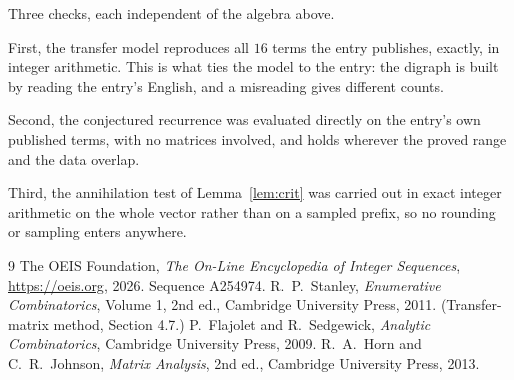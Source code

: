 \documentclass[11pt,a4paper]{article}
\theoremstyle{plain}
\theoremstyle{definition}
\begin{document}
Three checks, each independent of the algebra above.

First, the transfer model reproduces all $16$ terms the entry publishes, exactly, in
integer arithmetic. This is what ties the model to the entry: the digraph is built by reading
the entry's English, and a misreading gives different counts.

Second, the conjectured recurrence was evaluated directly on the entry's own published terms,
with no matrices involved, and holds wherever the proved range and the data overlap.

Third, the annihilation test of Lemma~\ref{lem:crit} was carried out in exact integer
arithmetic on the whole vector rather than on a sampled prefix, so no rounding or sampling
enters anywhere.

\begin{thebibliography}{9}
 The OEIS Foundation, \emph{The On-Line Encyclopedia of Integer
Sequences}, \url{https://oeis.org}, 2026. Sequence A254974.
 R.~P.~Stanley, \emph{Enumerative Combinatorics}, Volume 1, 2nd ed.,
Cambridge University Press, 2011. (Transfer-matrix method, Section 4.7.)
 P.~Flajolet and R.~Sedgewick, \emph{Analytic Combinatorics}, Cambridge
University Press, 2009.
 R.~A.~Horn and C.~R.~Johnson, \emph{Matrix Analysis}, 2nd ed., Cambridge
University Press, 2013.
\end{thebibliography}
\end{document}
